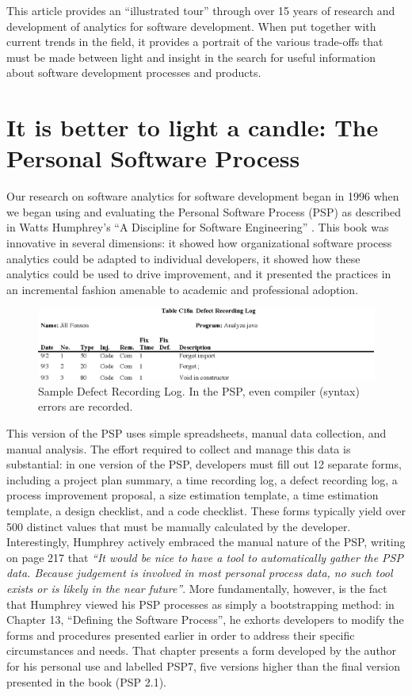 \documentclass[]{article}
\begin{document}
This article provides an ``illustrated tour'' through over 15 years of research and
development of analytics for software development. When put together with current trends
in the field, it provides a portrait of the various trade-offs that must be made between
light and insight in the search for useful information about software development
processes and products.

\section{It is better to light a candle: The Personal Software Process}

Our research on software analytics for software development began in 1996 when we began
using and evaluating the Personal Software Process (PSP) as described in Watts Humphrey's
``A Discipline for Software Engineering'' \cite{Humphrey95}. This book was innovative in
several dimensions: it showed how organizational software process analytics could be
adapted to individual developers, it showed how these analytics could be used to drive
improvement, and it presented the practices in an incremental fashion amenable to
academic and professional adoption. 

\begin{figure}[!tb]
\centering
\includegraphics[width=0.95\columnwidth]{defects.eps}
\caption{Sample Defect Recording Log. In the PSP, even compiler (syntax) errors are recorded.}
\label{fig:defect-log}
\end{figure}
 
This version of the PSP uses simple spreadsheets, manual data collection, and manual
analysis. The effort required to collect and manage this data is substantial: in one
version of the PSP, developers must fill out 12 separate forms, including a project plan
summary, a time recording log, a defect recording log, a process improvement proposal, a
size estimation template, a time estimation template, a design checklist, and a code
checklist. These forms typically yield over 500 distinct values that must be manually
calculated by the developer.  Interestingly, Humphrey actively embraced the manual nature
of the PSP, writing on page 217 that {\em ``It would be nice to have a tool to
  automatically gather the PSP data. Because judgement is involved in most personal
  process data, no such tool exists or is likely in the near future''}.  More
fundamentally, however, is the fact that Humphrey viewed his PSP processes as simply a
bootstrapping method: in Chapter 13, ``Defining the Software Process'', he exhorts
developers to modify the forms and procedures presented earlier in order to address their
specific circumstances and needs. That chapter presents a form developed by the author for
his personal use and labelled PSP7, five versions higher than the final version presented
in the book (PSP 2.1).
\end{document}
